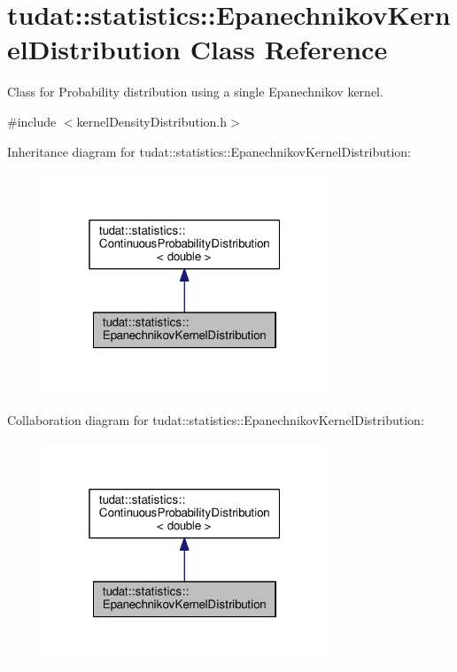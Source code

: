 \hypertarget{classtudat_1_1statistics_1_1EpanechnikovKernelDistribution}{}\section{tudat\+:\+:statistics\+:\+:Epanechnikov\+Kernel\+Distribution Class Reference}
\label{classtudat_1_1statistics_1_1EpanechnikovKernelDistribution}


Class for Probability distribution using a single Epanechnikov kernel.  




{\ttfamily \#include $<$kernel\+Density\+Distribution.\+h$>$}



Inheritance diagram for tudat\+:\+:statistics\+:\+:Epanechnikov\+Kernel\+Distribution\+:
\nopagebreak
\begin{figure}[H]
\begin{center}
\leavevmode
\includegraphics[width=241pt]{classtudat_1_1statistics_1_1EpanechnikovKernelDistribution__inherit__graph}
\end{center}
\end{figure}


Collaboration diagram for tudat\+:\+:statistics\+:\+:Epanechnikov\+Kernel\+Distribution\+:
\nopagebreak
\begin{figure}[H]
\begin{center}
\leavevmode
\includegraphics[width=241pt]{classtudat_1_1statistics_1_1EpanechnikovKernelDistribution__coll__graph}
\end{center}
\end{figure}
